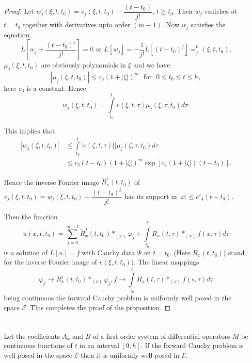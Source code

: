 \begin{proof}
Let $w_j (\xi, t, t_0) = v_j (\xi,  t, t_0) - \dfrac{(t-t_0)}{j!}$, $t
\geq t_0$. Then $w_j$ vanishes at $t=t_0$ together with derivatives
upto order $(m-1)$. Now $w_j$ satisfies the equation. 
$$
\tilde{L} \left[w_j + \frac{(t-t_0)^j}{j!}\right] = 0 \text{ or } 
\tilde{L} [w_j] = - \frac{1}{j!} \tilde{L} [(t-t_0)^j] = ^\mu_j (\xi, 
t, t_0).  
$$\pageoriginale
$\mu_j (\xi, t, t_0)$ are obviously polynomials in $\xi$ and we have
$$
| \mu_j (\xi, t, t_0) | \leq c_3 (1+|\xi|)^m \text{~ for~ } 0\leq t_0
\le t \le h,  
$$ 
here $c_3$ is a constant. Hence 
$$
w_j (\xi,  t, t_0) = \int\limits^t_{t_0} v (\xi, t, \tau) \mu_j (\xi,
\tau, t_0) d\tau. 
$$ 

This implies that 
\begin{align*}
|w_j(\zeta, t, t_0)| &\leq \int\limits^t_{t_0} | v (\zeta, t, \tau) |
| \mu_j (\zeta,  \tau, t_0) d\tau \\ 
&\leq c_3 (t-t_0) (1+|\zeta|) ^m \exp [c_4 (1+|\zeta|) (t-t_0)]. 
\end{align*}

Hence the inverse Fourier image $\tilde{R}^j_x (t, t_0)$ of $v_j(\xi, 
t, t_0) = w_j (\xi, t, t_0) + \dfrac{(t-t_0)^j}{j!}$ has its support
in $|x| \leq c'_4 (t-t_0)$. 

Then the function
\begin{equation}
u(x, t, t_0) = \sum\limits^{m-1}_{j=0} \tilde{R}^j_x (t, t_0) *_{(x)}
\varphi_j + \int\limits^{t}_{t_0} R_x (t, \tau ) *_{(x)} f (x, \tau )
d\tau \tag{3.7}\label{chap2-eq3.7} 
\end{equation}
is a solution of $L[u] = f$ with Cauchy data $\Psi$ on $t=t_0$. (Here
$R_x (t, t_0)$) stand for the inverse Fourier image of $v(\xi, t,
t_0))$. The linear mappings 
\begin{equation}
\varphi_j \to R^j_x(t, t_0)*_{(x)} \varphi_j ,  f \to
\int\limits^{t}_{t_0} R_x (t, \tau ) *_{(x)} f (s, \tau ) d\tau
\tag{3.8}\label{chap2-eq3.8} 
\end{equation}
being continuous the forward Cauchy problem is uniformly well posed in
the space $\mathscr{E}$. This completes the proof of the proposition.  
\end{proof}

\section{}\pageoriginale\label{chap2-sec4}%

\setcounter{proposition}{0}
\begin{proposition}\label{chap2-sec4-prop1}%
Let the coefficients $A_k$ and $B$ of a first order system of
differential operators $M$ be continuous functions of $t$ in an
interval $[0, h]$. If the forward Cauchy problem is well posed in the
space $\mathscr{E}$ then it is uniformly well posed in $\mathscr{E}$. 
\end{proposition} 

